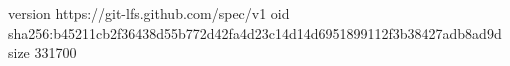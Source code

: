 version https://git-lfs.github.com/spec/v1
oid sha256:b45211cb2f36438d55b772d42fa4d23c14d14d6951899112f3b38427adb8ad9d
size 331700
